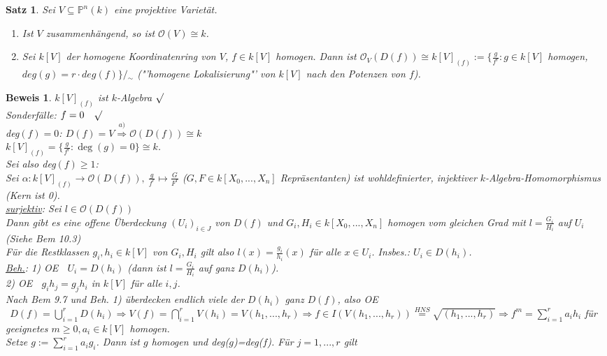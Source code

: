 \documentclass[a4paper,12pt]{report}
\theoremstyle{break}
\newtheorem{Satz}{Satz}
\theoremstyle{nonumberbreak}
\theoremstyle{nonumberplain}
\newtheorem{Bew}{Beweis}
\renewcommand{\OE}{O\!\!E~}
\begin{document}
\begin{Satz}
Sei $V\subseteq \mathbb{P}^n(k)$ eine projektive Varietät.\\
\begin{enumerate}
\item Ist $V$ zusammenhängend, so ist $\mathcal{O}(V)\cong k$.\\
\item Sei $k[V]$ der homogene Koordinatenring von $V$, $f\in k[V]$ homogen. Dann ist
$\mathcal{O}_V(D(f))\cong k[V]_{(f)}:= \{\frac{g}{f^r}: g\in k[V]$ homogen, $deg(g)=r\cdot deg(f)\}/\!\!{}_\sim$
("'homogene Lokalisierung"' von $k[V]$ nach den Potenzen von $f$).
\end{enumerate}
\end{Satz}
\begin{Bew} $k[V]_{(f)}$ ist $k$-Algebra $\surd$\\
Sonderfälle: $f=0~~~\surd$\\
deg$(f)=0$: $D(f)=V\stackrel{a)}{\Rightarrow}\mathcal{O}(D(f))\cong k$\\
$k[V]_{(f)}=\{\frac{g}{f^r}: \operatorname{deg}(g)=0\}\cong k$.\\
Sei also deg$(f)\geq 1$:\\
Sei $\alpha: k[V]_{(f)}\rightarrow \mathcal{O}(D(f)),~\frac{g}{f^r}\mapsto\frac{G}{F^r}$ ($G,F\in k[X_0,...,X_n]$ Repräsentanten) ist wohldefinierter, injektiver $k$-Algebra-Homomorphismus (Kern ist 0).\\
\underline{surjektiv}: Sei $l\in\mathcal{O}(D(f))$\\
Dann gibt es eine offene Überdeckung $(U_i)_{i\in J}$ von $D(f)$ und $G_i, H_i\in k[X_0,...,X_n]$ homogen vom gleichen Grad mit $l=\frac{G_i}{H_i}$ auf $U_i$ (Siehe Bem 10.3)\\
Für die Restklassen $g_i, h_i\in k[V]$ von $G_i, H_i$ gilt also $l(x)=\frac{g_i}{h_i}(x)$ für alle $x\in U_i$. Insbes.: $U_i\in D(h_i)$.\\
\underline{Beh.}: 1) \OE $~~U_i=D(h_i)$ (dann ist $l=\frac{G_i}{H_i}$ auf ganz $D(h_i)$).\\
2) \OE $~~g_ih_j=g_jh_i$ in $k[V]$ für alle $i,j$.\\
Nach Bem 9.7 und Beh. 1) überdecken endlich viele der $D(h_i)$ ganz $D(f)$, also \OE $~~D(f)=\bigcup_{i=1}^rD(h_i)\Rightarrow V(f)=\bigcap_{i=1}^rV(h_i)=V(h_1,...,h_r)\Rightarrow f\in I(V(h_1,...,h_r))\stackrel{HNS}{=} \sqrt{(h_1,...,h_r)}\Rightarrow f^m=\sum_{i=1}^ra_ih_i$ für geeignetes $m\geq 0, a_i\in k[V]$ homogen.\\
Setze $g:= \sum_{i=1}^ra_ig_i$. Dann ist $g$ homogen und deg($g$)=deg($f$). Für $j=1,...,r$ gilt

\end{Bew}
\end{document}
